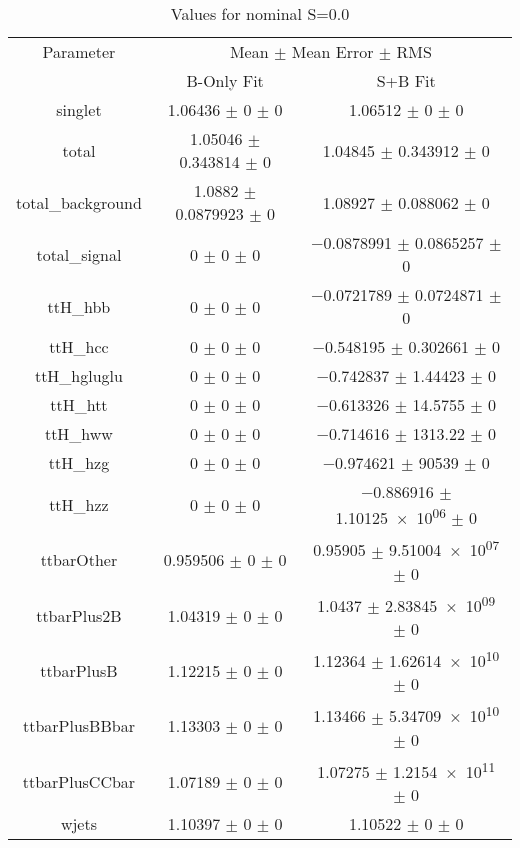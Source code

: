 \begin{table}
\centering
\caption{Values for nominal S=0.0}
\begin{tabular}{ccc}
\toprule
Parameter & \multicolumn{2}{c}{Mean $\pm$ Mean Error $\pm$ RMS}\\
 & B-Only Fit & S+B Fit\\
\midrule
singlet & \num{1.06436} $\pm$ \num{0} $\pm$ \num{0} & \num{1.06512} $\pm$ \num{0} $\pm$ \num{0}\\
total & \num{1.05046} $\pm$ \num{0.343814} $\pm$ \num{0} & \num{1.04845} $\pm$ \num{0.343912} $\pm$ \num{0}\\
total\_background & \num{1.0882} $\pm$ \num{0.0879923} $\pm$ \num{0} & \num{1.08927} $\pm$ \num{0.088062} $\pm$ \num{0}\\
total\_signal & \num{0} $\pm$ \num{0} $\pm$ \num{0} & \num{-0.0878991} $\pm$ \num{0.0865257} $\pm$ \num{0}\\
ttH\_hbb & \num{0} $\pm$ \num{0} $\pm$ \num{0} & \num{-0.0721789} $\pm$ \num{0.0724871} $\pm$ \num{0}\\
ttH\_hcc & \num{0} $\pm$ \num{0} $\pm$ \num{0} & \num{-0.548195} $\pm$ \num{0.302661} $\pm$ \num{0}\\
ttH\_hgluglu & \num{0} $\pm$ \num{0} $\pm$ \num{0} & \num{-0.742837} $\pm$ \num{1.44423} $\pm$ \num{0}\\
ttH\_htt & \num{0} $\pm$ \num{0} $\pm$ \num{0} & \num{-0.613326} $\pm$ \num{14.5755} $\pm$ \num{0}\\
ttH\_hww & \num{0} $\pm$ \num{0} $\pm$ \num{0} & \num{-0.714616} $\pm$ \num{1313.22} $\pm$ \num{0}\\
ttH\_hzg & \num{0} $\pm$ \num{0} $\pm$ \num{0} & \num{-0.974621} $\pm$ \num{90539} $\pm$ \num{0}\\
ttH\_hzz & \num{0} $\pm$ \num{0} $\pm$ \num{0} & \num{-0.886916} $\pm$ \num{1.10125e+06} $\pm$ \num{0}\\
ttbarOther & \num{0.959506} $\pm$ \num{0} $\pm$ \num{0} & \num{0.95905} $\pm$ \num{9.51004e+07} $\pm$ \num{0}\\
ttbarPlus2B & \num{1.04319} $\pm$ \num{0} $\pm$ \num{0} & \num{1.0437} $\pm$ \num{2.83845e+09} $\pm$ \num{0}\\
ttbarPlusB & \num{1.12215} $\pm$ \num{0} $\pm$ \num{0} & \num{1.12364} $\pm$ \num{1.62614e+10} $\pm$ \num{0}\\
ttbarPlusBBbar & \num{1.13303} $\pm$ \num{0} $\pm$ \num{0} & \num{1.13466} $\pm$ \num{5.34709e+10} $\pm$ \num{0}\\
ttbarPlusCCbar & \num{1.07189} $\pm$ \num{0} $\pm$ \num{0} & \num{1.07275} $\pm$ \num{1.2154e+11} $\pm$ \num{0}\\
wjets & \num{1.10397} $\pm$ \num{0} $\pm$ \num{0} & \num{1.10522} $\pm$ \num{0} $\pm$ \num{0}\\
\bottomrule
\end{tabular}
\end{table}